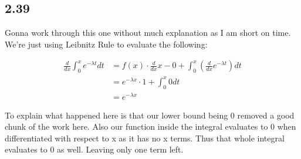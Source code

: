 \subsection*{2.39}

Gonna work through this one without much explanation as I am short on time. We're just using Leibnitz Rule to evaluate the following:

\begin{align*}
	\frac{d}{dx} \int_0^x e^{-\lambda t} dt &= f(x) \cdot \frac{d}{dx} x - 0 + \int_0^x \left( \frac{d}{dx} e^{-\lambda t} \right) dt \\
	&= e^{-\lambda x} \cdot 1 + \int_0^x 0 dt \\
	&= e^{-\lambda x}
\end{align*}

To explain what happened here is that our lower bound being 0 removed a good chunk of the work here. Also our function inside the integral evaluates to 0 when differentiated with respect to x as it has no x terms. Thus that whole integral evaluates to 0 as well. Leaving only one term left.
